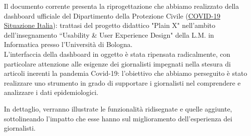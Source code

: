 \documentclass[../../main.tex]{subfiles}
\begin{document}
\begin{executive}

    Il documento corrente presenta la riprogettazione che abbiamo realizzato della dashboard ufficiale del Dipartimento della Protezione Civile (\href{https://opendatadpc.maps.arcgis.com/apps/opsdashboard/index.html#/b0c68bce2cce478eaac82fe38d4138b1}{COVID-19 Situazione Italia}): trattasi del progetto didattico "Plain X" nell'ambito dell'insegnamento ``Usability \& User Experience Design" della L.M. in Informatica presso l'Università di Bologna.\\
    L'interfaccia della dashboard in oggetto è stata ripensata radicalmente, con particolare attenzione alle esigenze dei giornalisti impegnati nella stesura di articoli inerenti la pandemia Covid-19: l'obiettivo che abbiamo perseguito è stato realizzare uno strumento in grado di supportare i giornalisti nel comprendere e analizzare i dati epidemiologici.

    In dettaglio, verranno illustrate le funzionalità ridisegnate e quelle aggiunte, sottolineando l'impatto che esse hanno sul miglioramento dell'esperienza dei giornalisti.

\end{executive}
\end{document}
